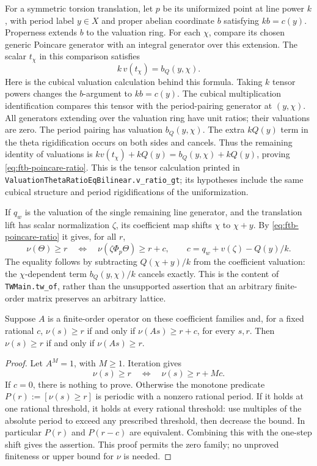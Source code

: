 For a symmetric torsion translation, let \(p\) be its uniformized
point at line power \(k\), with period label \(y\in X\) and proper
abelian coordinate \(b\) satisfying \(kb=c(y)\).
Properness extends \(b\) to the valuation ring.
For each \(\chi\), compare its chosen generic Poincare generator with
an integral generator over this extension.
The scalar \(t_\chi\) in this comparison satisfies
\begin{equation}\label{eq:ftb-poincare-ratio}
                     k\,v(t_\chi)=b_Q(y,\chi).
\end{equation}
Here is the cubical valuation calculation behind this formula.
Taking \(k\) tensor powers changes the \(b\)-argument to \(kb=c(y)\).
The cubical multiplication identification compares this tensor with
the period-pairing generator at \((y,\chi)\).
All generators extending over the valuation ring have unit ratios;
their valuations are zero.  The period pairing has valuation
\(b_Q(y,\chi)\).
The extra \(kQ(y)\) term in the theta rigidification occurs on both
sides and cancels.  Thus the remaining identity of valuations is
\(kv(t_\chi)+kQ(y)=b_Q(y,\chi)+kQ(y)\), proving
\eqref{eq:ftb-poincare-ratio}.
This is the tensor calculation printed in
\texttt{ValuationThetaRatioEqBilinear.v\_ratio\_gt};
its hypotheses include the same cubical structure and period
rigidifications of the uniformization.

If \(q_w\) is the valuation of the single remaining line generator,
and the translation lift has scalar normalization \(\zeta\), its
coefficient map shifts \(\chi\) to \(\chi+y\).
By \eqref{eq:ftb-poincare-ratio} it gives, for all \(r\),
\[
 \nu(\Theta)\ge r
 \quad\Longleftrightarrow\quad
 \nu(\zeta\Phi_p\Theta)\ge r+c,\qquad
 c=q_w+v(\zeta)-Q(y)/k .
\]
The equality follows by subtracting
\(Q(\chi+y)/k\) from the coefficient valuation:
the \(\chi\)-dependent term
\(b_Q(y,\chi)/k\) cancels exactly.
This is the content of \texttt{TWMain.tw\_of}, rather than the
unsupported assertion that an arbitrary finite-order matrix preserves
an arbitrary lattice.

\begin{srlemma}\label{lem:ftb-periodic-nu}
Suppose \(A\) is a finite-order operator on these coefficient
families and, for a fixed rational \(c\),
\(\nu(s)\ge r\) if and only if \(\nu(As)\ge r+c\), for every \(s,r\).
Then \(\nu(s)\ge r\) if and only if \(\nu(As)\ge r\).
\end{srlemma}
\begin{proof}
Let \(A^M=1\), with \(M\ge1\).
Iteration gives
\[
      \nu(s)\ge r\quad\Longleftrightarrow\quad
                              \nu(s)\ge r+Mc.
\]
If \(c=0\), there is nothing to prove.
Otherwise the monotone predicate \(P(r):=[\nu(s)\ge r]\) is periodic
with a nonzero rational period.  If it holds at one rational threshold,
it holds at every rational threshold: use multiples of the absolute
period to exceed any prescribed threshold, then decrease the bound.
In particular \(P(r)\) and \(P(r-c)\) are equivalent.
Combining this with the one-step shift gives the assertion.
This proof permits the zero family; no unproved finiteness or upper
bound for \(\nu\) is needed.
\end{proof}

